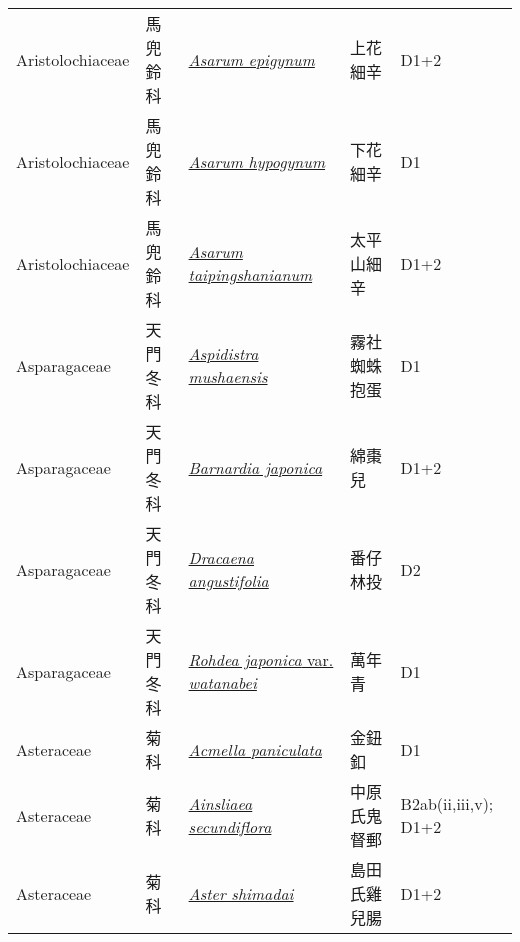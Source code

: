{\begin{longtable}{p{2.5cm}p{2cm}p{5cm}p{2.5cm}p{3cm}}
    Aristolochiaceae & 馬兜鈴科 & \href{http://www.theplantlist.org/tpl1.1/search?q=Asarum+epigynum}{\textit{Asarum epigynum} } & 上花細辛 & D1+2 \index{Asarum@\textit{Asarum}!epigynum@\textit{epigynum}}  \index{上花細辛} \\
    Aristolochiaceae & 馬兜鈴科 & \href{http://www.theplantlist.org/tpl1.1/search?q=Asarum+hypogynum}{\textit{Asarum hypogynum} } & 下花細辛 & D1 \index{Asarum@\textit{Asarum}!hypogynum@\textit{hypogynum}}  \index{下花細辛} \\
    Aristolochiaceae & 馬兜鈴科 & \href{http://www.theplantlist.org/tpl1.1/search?q=Asarum+taipingshanianum}{\textit{Asarum taipingshanianum} } & 太平山細辛 & D1+2 \index{Asarum@\textit{Asarum}!taipingshanianum@\textit{taipingshanianum}}  \index{太平山細辛} \\
    Asparagaceae & 天門冬科 & \href{http://www.theplantlist.org/tpl1.1/search?q=Aspidistra+mushaensis}{\textit{Aspidistra mushaensis} } & 霧社蜘蛛抱蛋 & D1 \index{Aspidistra@\textit{Aspidistra}!mushaensis@\textit{mushaensis}}  \index{霧社蜘蛛抱蛋} \\
    Asparagaceae & 天門冬科 & \href{http://www.theplantlist.org/tpl1.1/search?q=Barnardia+japonica}{\textit{Barnardia japonica} } & 綿棗兒 & D1+2 \index{Barnardia@\textit{Barnardia}!japonica@\textit{japonica}}  \index{綿棗兒} \\
    Asparagaceae & 天門冬科 & \href{http://www.theplantlist.org/tpl1.1/search?q=Dracaena+angustifolia}{\textit{Dracaena angustifolia} } & 番仔林投 & D2 \index{Dracaena@\textit{Dracaena}!angustifolia@\textit{angustifolia}}  \index{番仔林投} \\
    Asparagaceae & 天門冬科 & \href{http://www.theplantlist.org/tpl1.1/search?q=Rohdea+japonica+var.+watanabei}{\textit{Rohdea japonica} var. \textit{watanabei} } & 萬年青 & D1 \index{Rohdea@\textit{Rohdea}!japonica@\textit{japonica}!var. watanabei@var. \textit{watanabei}}  \index{萬年青} \\
    Asteraceae & 菊科 & \href{http://www.theplantlist.org/tpl1.1/search?q=Acmella+paniculata}{\textit{Acmella paniculata} } & 金鈕釦 & D1 \index{Acmella@\textit{Acmella}!paniculata@\textit{paniculata}}  \index{金鈕釦} \\
    Asteraceae & 菊科 & \href{http://www.theplantlist.org/tpl1.1/search?q=Ainsliaea+secundiflora}{\textit{Ainsliaea secundiflora} } & 中原氏鬼督郵 & B2ab(ii,iii,v); D1+2 \index{Ainsliaea@\textit{Ainsliaea}!secundiflora@\textit{secundiflora}}  \index{中原氏鬼督郵} \\
    Asteraceae & 菊科 & \href{http://www.theplantlist.org/tpl1.1/search?q=Aster+shimadai}{\textit{Aster shimadai} } & 島田氏雞兒腸 & D1+2 \index{Aster@\textit{Aster}!shimadai@\textit{shimadai}}  \index{島田氏雞兒腸} \\

\end{longtable}}
